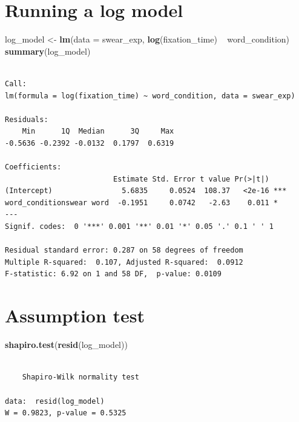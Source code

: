 \documentclass[]{article}
\newenvironment{Shaded}{}{}
\newcommand{\KeywordTok}[1]{\textcolor[rgb]{0.00,0.44,0.13}{\textbf{{#1}}}}
\newcommand{\DataTypeTok}[1]{\textcolor[rgb]{0.56,0.13,0.00}{{#1}}}
\newcommand{\StringTok}[1]{\textcolor[rgb]{0.25,0.44,0.63}{{#1}}}
\newcommand{\NormalTok}[1]{{#1}}
\begin{document}
\section{Running a log model}\label{running-a-log-model}

\begin{Shaded}
\begin{Highlighting}[]
\NormalTok{log_model <-}\StringTok{ }\KeywordTok{lm}\NormalTok{(}\DataTypeTok{data =} \NormalTok{swear_exp, }\KeywordTok{log}\NormalTok{(fixation_time) ~}\StringTok{ }\NormalTok{word_condition)}
\KeywordTok{summary}\NormalTok{(log_model)}
\end{Highlighting}
\end{Shaded}

\begin{verbatim}

Call:
lm(formula = log(fixation_time) ~ word_condition, data = swear_exp)

Residuals:
    Min      1Q  Median      3Q     Max 
-0.5636 -0.2392 -0.0132  0.1797  0.6319 

Coefficients:
                         Estimate Std. Error t value Pr(>|t|)    
(Intercept)                5.6835     0.0524  108.37   <2e-16 ***
word_conditionswear word  -0.1951     0.0742   -2.63    0.011 *  
---
Signif. codes:  0 '***' 0.001 '**' 0.01 '*' 0.05 '.' 0.1 ' ' 1

Residual standard error: 0.287 on 58 degrees of freedom
Multiple R-squared:  0.107, Adjusted R-squared:  0.0912 
F-statistic: 6.92 on 1 and 58 DF,  p-value: 0.0109
\end{verbatim}

\section{Assumption test}\label{assumption-test-1}

\begin{Shaded}
\begin{Highlighting}[]
\KeywordTok{shapiro.test}\NormalTok{(}\KeywordTok{resid}\NormalTok{(log_model))}
\end{Highlighting}
\end{Shaded}

\begin{verbatim}

    Shapiro-Wilk normality test

data:  resid(log_model)
W = 0.9823, p-value = 0.5325
\end{verbatim}
\end{document}
